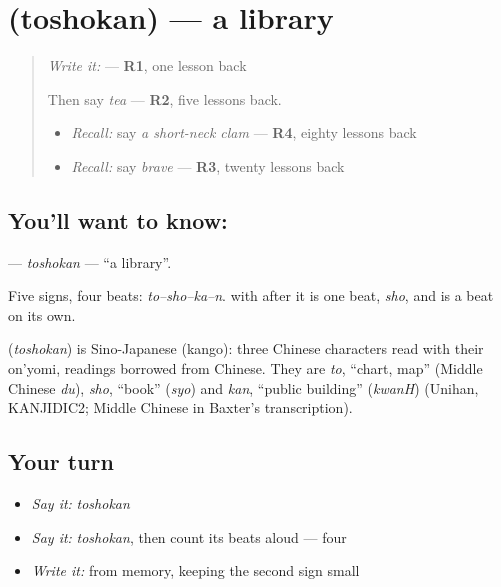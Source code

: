 \section[\texorpdfstring{\ja{としょかん} (toshokan)}{としょかん (toshokan)}]{ (toshokan) — a library}

\label{lesson:JA-C131-toshokan}



\begin{quote}
\emph{Write it:} \textbf{} — \textbf{R1}, one lesson back

Then say \emph{tea} — \textbf{R2}, five lessons back.

\begin{itemize}
\raggedright
  \item \emph{Recall:} say \emph{a short-neck clam} — \textbf{R4}, eighty lessons back
  \item \emph{Recall:} say \emph{brave} — \textbf{R3}, twenty lessons back
\end{itemize}
\end{quote}

\subsection*{You'll want to know: }
\textbf{} — \emph{toshokan} — \textquotedblleft{}a library\textquotedblright{}.

Five signs, four beats: \emph{to–sho–ka–n}. \textbf{} with \textbf{} after it is one beat, \emph{sho}, and \textbf{} is a beat on its own.

\begin{cousinweb}
\textbf{} (\emph{toshokan}) is Sino-Japanese (kango): three Chinese characters read with their on'yomi, readings borrowed from Chinese. They are \emph{to}, \textquotedblleft{}chart, map\textquotedblright{} (Middle Chinese \emph{du}), \emph{sho}, \textquotedblleft{}book\textquotedblright{} (\emph{syo}) and \emph{kan}, \textquotedblleft{}public building\textquotedblright{} (\emph{kwanH}) (Unihan, KANJIDIC2; Middle Chinese in Baxter's transcription).
\end{cousinweb}

\subsection*{Your turn}
\begin{itemize}
\raggedright
  \item \emph{Say it:} \emph{toshokan}
  \item \emph{Say it:} \emph{toshokan}, then count its beats aloud — four
  \item \emph{Write it:} \textbf{} from memory, keeping the second sign small
\end{itemize}

